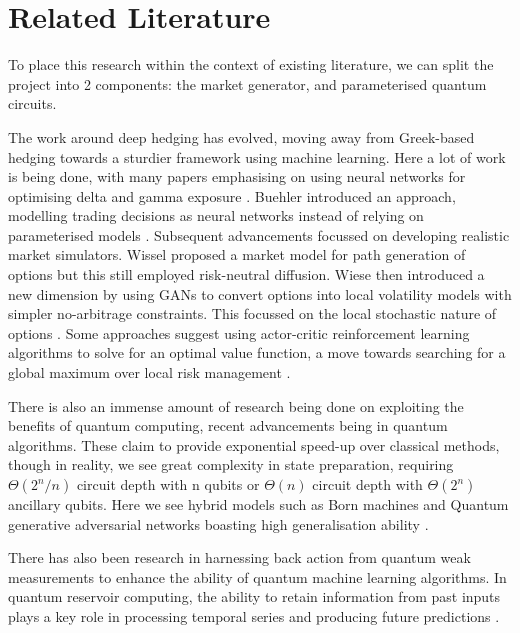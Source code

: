 \documentclass[12pt]{article}
\newcommand{\newp}
    {
    \vskip 0.5cm 
  }
\numberwithin{equation}{section}
\begin{document}
\section{Related Literature}
To place this research within the context of existing literature, we can split 
the project into 2 components: the market generator, and 
parameterised quantum circuits.
\newp
The work around deep hedging has evolved, moving away from 
Greek-based hedging towards a sturdier framework using machine 
learning. Here a lot of work is being done, with many papers emphasising 
on using neural networks for optimising delta and gamma exposure
\autocite{armstrong_deep_2024,qiao_enhancing_2024}.
Buehler introduced an approach, modelling trading decisions 
as neural networks instead of relying on parameterised models
\autocite{buehler_deep_2019}. Subsequent advancements focussed on developing 
realistic market simulators. Wissel 
proposed a market model for path generation of options but this still 
employed risk-neutral diffusion\autocite{schweizer_arbitrage-free_2008}. Wiese 
then introduced 
a new dimension by using GANs to convert options into 
local volatility models with simpler no-arbitrage constraints. This focussed 
on the local stochastic nature of options
\autocite{choudhary_funvol_2023,wiese_deep_2019,wiese_multi-asset_2021}.
Some approaches suggest using actor-critic reinforcement learning algorithms to 
solve for an optimal value function, a move towards searching for a global
maximum over local risk management
\autocite{buehler_deep_2022,movahed_introducing_2024}.
\newp
There is also an immense amount of research being done on exploiting the benefits of 
quantum computing, recent advancements being in quantum algorithms. 
These claim to provide exponential speed-up over classical 
methods, though in reality, we see great complexity in state preparation, requiring 
$\Theta(2^n/n)$ circuit depth with n qubits or $\Theta(n)$ circuit depth with 
$\Theta(2^n)$ ancillary qubits\autocite{zhang_quantum_2022}. Here we see hybrid 
models such as Born machines
and Quantum generative adversarial networks boasting high generalisation ability
\autocite{ganguly_implementing_nodate,gili_2022_do,horowitz_quantum_2022}.
\newp
There has also been research in harnessing back action from quantum weak 
measurements to enhance the ability of quantum machine learning algorithms. 
In quantum reservoir computing,
the ability to retain information from past inputs plays a key role in processing 
temporal series and producing future predictions
\autocite{franceschetto_harnessing_2024,fujii_quantum_2020,garcia-beni_squeezing_2024,mujal_time-series_2023}.
\end{document}
